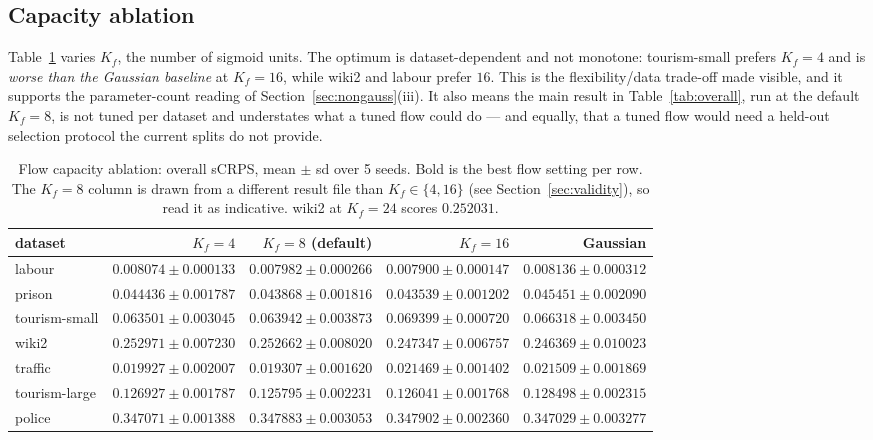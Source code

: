 \documentclass[11pt]{article}
\begin{document}
\subsection{Capacity ablation}
Table~\ref{tab:capacity} varies $K_f$, the number of sigmoid units. The optimum is
dataset-dependent and not monotone: tourism-small prefers $K_f = 4$ and is
\emph{worse than the Gaussian baseline} at $K_f = 16$, while wiki2 and labour prefer
$16$. This is the flexibility/data trade-off made visible, and it supports the
parameter-count reading of Section~\ref{sec:nongauss}(iii). It also means the main
result in Table~\ref{tab:overall}, run at the default $K_f = 8$, is not tuned per
dataset and understates what a tuned flow could do --- and equally, that a tuned flow
would need a held-out selection protocol the current splits do not provide.

\begin{table}[t]
\centering
\caption{Flow capacity ablation: overall sCRPS, mean $\pm$ sd over 5 seeds. Bold is
the best flow setting per row. The $K_f{=}8$ column is drawn from a different result
file than $K_f \in \{4,16\}$ (see Section~\ref{sec:validity}), so read it as
indicative. wiki2 at $K_f{=}24$ scores $0.252031$.}
\label{tab:capacity}
\small
\begin{tabular}{lrrrr}
\toprule
dataset & $K_f{=}4$ & $K_f{=}8$ (default) & $K_f{=}16$ & Gaussian \\
\midrule
labour        & $0.008074 \pm 0.000133$ & $0.007982 \pm 0.000266$ & $\mathbf{0.007900 \pm 0.000147}$ & $0.008136 \pm 0.000312$ \\
prison        & $0.044436 \pm 0.001787$ & $0.043868 \pm 0.001816$ & $\mathbf{0.043539 \pm 0.001202}$ & $0.045451 \pm 0.002090$ \\
tourism-small & $\mathbf{0.063501 \pm 0.003045}$ & $0.063942 \pm 0.003873$ & $0.069399 \pm 0.000720$ & $0.066318 \pm 0.003450$ \\
wiki2         & $0.252971 \pm 0.007230$ & $0.252662 \pm 0.008020$ & $\mathbf{0.247347 \pm 0.006757}$ & $0.246369 \pm 0.010023$ \\
traffic       & $0.019927 \pm 0.002007$ & $\mathbf{0.019307 \pm 0.001620}$ & $0.021469 \pm 0.001402$ & $0.021509 \pm 0.001869$ \\
tourism-large & $0.126927 \pm 0.001787$ & $\mathbf{0.125795 \pm 0.002231}$ & $0.126041 \pm 0.001768$ & $0.128498 \pm 0.002315$ \\
police        & $\mathbf{0.347071 \pm 0.001388}$ & $0.347883 \pm 0.003053$ & $0.347902 \pm 0.002360$ & $0.347029 \pm 0.003277$ \\
\bottomrule
\end{tabular}
\end{table}
\end{document}
